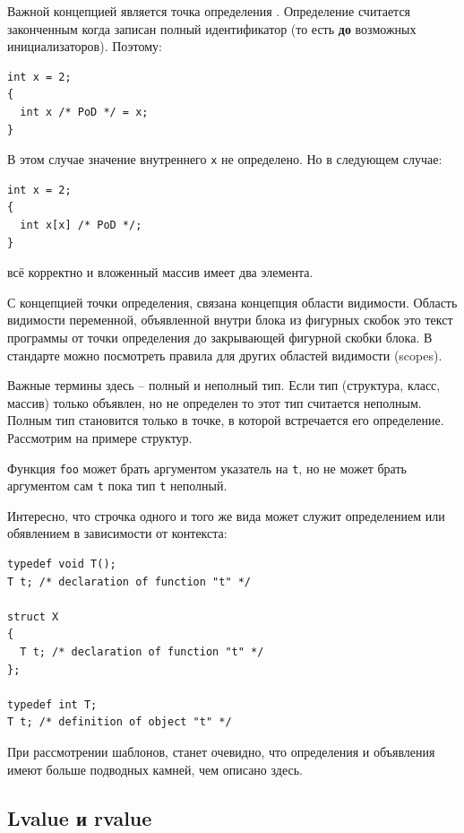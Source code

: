 \documentclass[a4paper,12pt,oneside]{article}
\begin{document}
Важной концепцией является точка определения . Определение считается законченным когда записан полный идентификатор (то есть \textbf{до} возможных инициализаторов). Поэтому:

\begin{lstlisting}
int x = 2;
{
  int x /* PoD */ = x;
}
\end{lstlisting}

В этом случае значение внутреннего \lstinline!x! не определено. Но в следующем случае:

\begin{lstlisting}
int x = 2;
{
  int x[x] /* PoD */;
}
\end{lstlisting}

всё корректно и вложенный массив имеет два элемента.

С концепцией точки определения, связана концепция области видимости. Область видимости  переменной, объявленной внутри блока из фигурных скобок это текст программы от точки определения до закрывающей фигурной скобки блока. В стандарте можно посмотреть правила для других областей видимости (scopes).

Важные термины здесь – полный и неполный тип. Если тип (структура, класс, массив) только объявлен, но не определен то этот тип считается неполным. Полным тип  становится только в точке, в которой встречается его определение. Рассмотрим на примере структур.



Функция \lstinline!foo! может брать аргументом указатель на \lstinline!t!, но не может брать аргументом сам \lstinline!t! пока тип \lstinline!t! неполный.

Интересно, что строчка одного и того же вида может служит определением или обявлением в зависимости от контекста:

\begin{lstlisting}
typedef void T();
T t; /* declaration of function "t" */

struct X 
{ 
  T t; /* declaration of function "t" */
};

typedef int T;
T t; /* definition of object "t" */
\end{lstlisting}

При рассмотрении шаблонов, станет очевидно, что определения и объявления имеют больше подводных камней, чем описано здесь.

\subsection{Lvalue и rvalue}\label{LRvalues}
\end{document}
